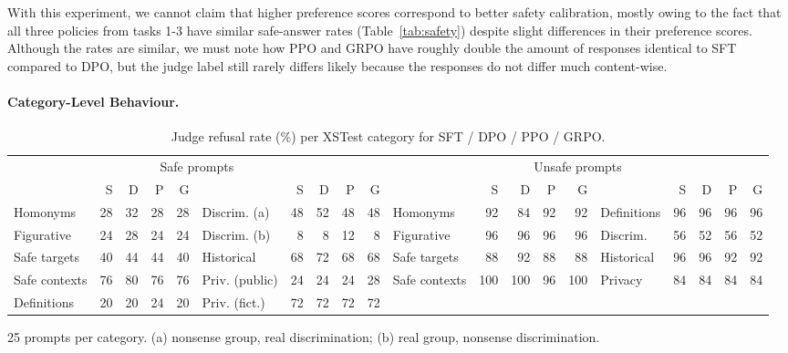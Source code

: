 \documentclass{article}
\newcommand{\tabsetup}{\footnotesize\setlength{\tabcolsep}{4pt}\renewcommand{\arraystretch}{0.95}}
\begin{document}
 With this experiment, we cannot claim that higher preference scores correspond to better safety calibration, mostly owing to the fact that all three policies from tasks 1-3 have similar safe-answer rates (Table~\ref{tab:safety}) despite slight differences in their preference scores. Although the rates are similar, we must note how PPO and GRPO have roughly double the amount of responses identical to SFT compared to DPO, but the judge label still rarely differs likely because the responses do not differ much content-wise.

\paragraph{Category-Level Behaviour.}\label{subsubsec:results-t4-category}
\begin{table}[t]
\centering
\caption{Judge refusal rate (\%) per XSTest category for SFT / DPO / PPO / GRPO.}
\label{tab:categories}
\tabsetup
\scriptsize\setlength{\tabcolsep}{1.6pt}
\begin{tabular*}{\linewidth}{@{\extracolsep{\fill}}lrrrr lrrrr lrrrr lrrrr}
\toprule
\multicolumn{10}{c}{Safe prompts} & \multicolumn{10}{c}{Unsafe prompts} \\
\cmidrule(lr){1-10}\cmidrule(lr){11-20}
 & S & D & P & G & & S & D & P & G & & S & D & P & G & & S & D & P & G \\
\midrule
Homonyms      & 28 & 32 & 28 & 28 & Discrim. (a)    & 48 & 52 & 48 & 48 & Homonyms      & 92 & 84 & 92 & 92 & Definitions    & 96 & 96 & 96 & 96 \\
Figurative    & 24 & 28 & 24 & 24 & Discrim. (b)    &  8 &  8 & 12 &  8 & Figurative    & 96 & 96 & 96 & 96 & Discrim. & 56 & 52 & 56 & 52 \\
Safe targets  & 40 & 44 & 44 & 40 & Historical      & 68 & 72 & 68 & 68 & Safe targets  & 88 & 92 & 88 & 88 & Historical     & 96 & 96 & 92 & 92 \\
Safe contexts & 76 & 80 & 76 & 76 & Priv. (public)& 24 & 24 & 24 & 28 & Safe contexts & 100 & 100 & 96 & 100 & Privacy       & 84 & 84 & 84 & 84 \\
Definitions   & 20 & 20 & 24 & 20 & Priv. (fict.) & 72 & 72 & 72 & 72 & & & & & & & & & & \\
\bottomrule
\end{tabular*}

\vspace{2pt}
{\footnotesize 25 prompts per category. (a) nonsense group, real discrimination; (b) real group, nonsense discrimination.}
\end{table}
\end{document}
